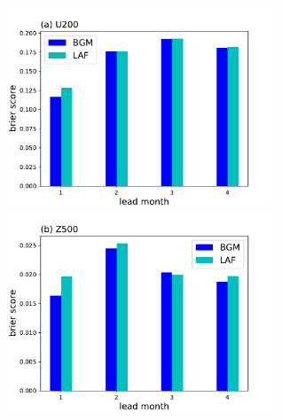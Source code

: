\begin{figure}[H]
\centering
\begin{minipage}[t]{0.48\textwidth}
\centering
\includegraphics[width=8cm]{figures/brier-15-U200.pdf}
\end{minipage}
\begin{minipage}[t]{0.48\textwidth}
\centering
\includegraphics[width=8cm]{figures/brier-15-Z500.pdf}
\end{minipage}


\end{figure}
